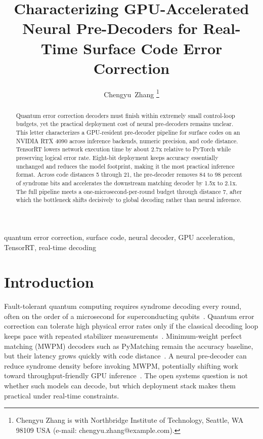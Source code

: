 \documentclass[journal]{IEEEtran}
\begin{document}
\title{Characterizing GPU-Accelerated Neural Pre-Decoders for Real-Time Surface Code Error Correction}

\author{Chengyu~Zhang%
\thanks{Chengyu Zhang is with Northbridge Institute of Technology, Seattle, WA 98109 USA (e-mail: chengyu.zhang@example.com).}}

\maketitle

\begin{abstract}
Quantum error correction decoders must finish within extremely small control-loop budgets, yet the practical deployment cost of neural pre-decoders remains unclear. This letter characterizes a GPU-resident pre-decoder pipeline for surface codes on an NVIDIA RTX 4090 across inference backends, numeric precision, and code distance. TensorRT lowers network execution time by about 2.7x relative to PyTorch while preserving logical error rate. Eight-bit deployment keeps accuracy essentially unchanged and reduces the model footprint, making it the most practical inference format. Across code distances 5 through 21, the pre-decoder removes 84 to 98 percent of syndrome bits and accelerates the downstream matching decoder by 1.5x to 2.1x. The full pipeline meets a one-microsecond-per-round budget through distance 7, after which the bottleneck shifts decisively to global decoding rather than neural inference.
\end{abstract}

\begin{IEEEkeywords}
quantum error correction, surface code, neural decoder, GPU acceleration, TensorRT, real-time decoding
\end{IEEEkeywords}

\section{Introduction}

Fault-tolerant quantum computing requires syndrome decoding every round, often on the order of a microsecond for superconducting qubits~\cite{google2023suppressing,battistel2023real}. Quantum error correction can tolerate high physical error rates only if the classical decoding loop keeps pace with repeated stabilizer measurements~\cite{terhal2015quantum}. Minimum-weight perfect matching (MWPM) decoders such as PyMatching remain the accuracy baseline, but their latency grows quickly with code distance~\cite{higgott2023sparse}. A neural pre-decoder can reduce syndrome density before invoking MWPM, potentially shifting work toward throughput-friendly GPU inference~\cite{nvidia2026predecoder}. The open systems question is not whether such models can decode, but which deployment stack makes them practical under real-time constraints.
\end{document}
